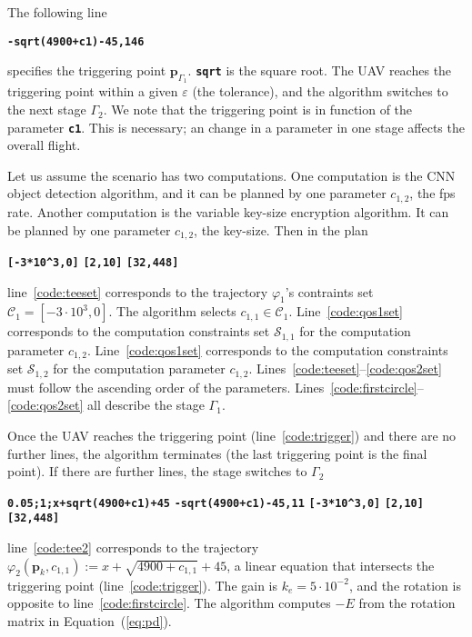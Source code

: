 \documentclass[letterpaper,10pt,conference]{ieeeconf}
\theoremstyle{definition}
\begin{document}
The following line
\begin{algorithmic}[1]
  \STATE\textbf{\texttt{-sqrt(4900+c1)-45,146}}\label{code:trigger}
\end{algorithmic}
specifies the triggering point $\mathbf{p}_{\Gamma_1}$. {\tt\textbf{sqrt}} is the square root. The UAV reaches the triggering point within a given $\varepsilon$ (the tolerance), and the algorithm switches to the next stage $\Gamma_2$. We note that the triggering point is in function of the parameter {\tt\textbf{c1}}. This is necessary; an change in a parameter in one stage affects the overall flight.

Let us assume the scenario has two computations. One computation is the CNN object detection algorithm, and it can be planned by one parameter $c_{1,2}$, the fps rate. Another computation is the variable key-size encryption algorithm. It can be planned by one parameter $c_{1,2}$, the key-size. Then in the plan
\begin{algorithmic}[1]
  \STATE\textbf{\texttt{[-3*10\^{}3,0]}}\label{code:teeset}
  \STATE\textbf{\texttt{[2,10]}}\label{code:qos1set}
  \STATE\textbf{\texttt{[32,448]}}\label{code:qos2set}
\end{algorithmic}
line~\ref{code:teeset} corresponds to the trajectory $\varphi_1$'s contraints set $\mathcal{C}_1=[-3\cdot10^3,0]$. The algorithm selects $c_{1,1}\in\mathcal{C}_1$. Line~\ref{code:qos1set} corresponds to the computation constraints set $\mathcal{S}_{1,1}$ for the computation parameter $c_{1,2}$. Line~\ref{code:qos1set} corresponds to the computation constraints set $\mathcal{S}_{1,2}$ for the computation parameter $c_{1,2}$. Lines~\ref{code:teeset}--\ref{code:qos2set} must follow the ascending order of the parameters. Lines~\ref{code:firstcircle}--\ref{code:qos2set} all describe the stage $\Gamma_1$.

Once the UAV reaches the triggering point (line~\ref{code:trigger}) and there are no further lines, the algorithm terminates (the last triggering point is the final point). If there are further lines, the stage switches to $\Gamma_2$
\begin{algorithmic}[1]
  \STATE\textbf{\texttt{0.05;1;x+sqrt(4900+c1)+45}}\label{code:tee2}
  \STATE\textbf{\texttt{-sqrt(4900+c1)-45,11}}\label{code:trigger2}
  \STATE\textbf{\texttt{[-3*10\^{}3,0]}}\label{code:teeset2}
  \STATE\textbf{\texttt{[2,10]}}
  \STATE\textbf{\texttt{[32,448]}}\label{code:qosset12}
\end{algorithmic}
line~\ref{code:tee2} corresponds to the trajectory $\varphi_2(\mathbf{p}_k,c_{1,1}):=x+\sqrt{4900+c_{1,1}}+45$, a linear equation that intersects the triggering point (line~\ref{code:trigger}). The gain is $k_e=5\cdot 10^{-2}$, and the rotation is opposite to line~\ref{code:firstcircle}. The algorithm computes $-E$ from the rotation matrix in Equation~(\ref{eq:pd}). 
\end{document}
